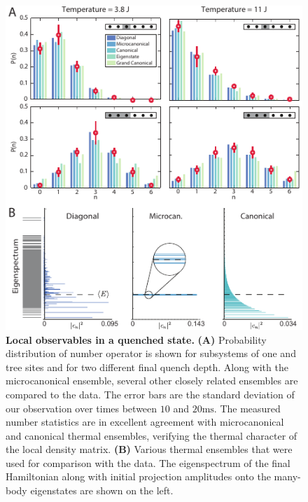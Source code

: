 \begin{figure}[t]
	\centering
	\includegraphics[scale=1.1]{figures/ETH_localDistr.pdf}
	\caption{{\bf Local observables in a quenched state. } {\bf (A)} Probability distribution of number operator is shown for subsystems of one and tree sites and for two different final quench depth. Along with the microcanonical ensemble, several other closely related ensembles are compared to the data. The error bars are the standard deviation of our observation over times between $10$ and $20\mathrm{ms}$. The measured number statistics are in excellent agreement with microcanonical and canonical thermal ensembles, verifying the thermal character of the local density matrix. {\bf (B)} Various thermal ensembles that were used for comparison with the data. The eigenspectrum of the final Hamiltonian along with initial projection amplitudes onto the many-body eigenstates are shown on the left.}
	\label{fig:ETH_Ensembles}
\end{figure}

